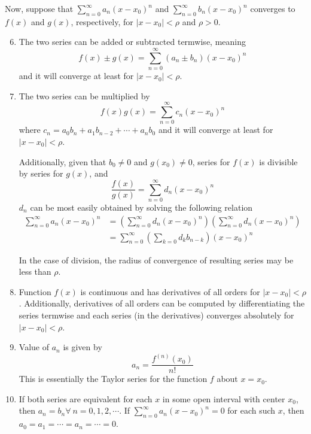 Now, suppose that $\sum_{n=0}^\infty a_n{(x-x_0)}^n$ and $\sum_{n=0}^\infty b_n{(x-x_0)}^n$ converges 
to $f(x)$ and $g(x)$, respectively, for $|x-x_0| < \rho$ and $\rho > 0$.

\begin{enumerate}
    \setcounter{enumi}{5}
    \item The two series can be added or subtracted termwise, meaning
        \[ f(x) \pm g(x) = \sum_{n=0}^\infty (a_n \pm b_n){(x-x_0)}^n \]
        and it will converge at least for $|x - x_0| < \rho$.
    \item The two series can be multiplied by
        \[ f(x)g(x) = \sum_{n = 0}^\infty c_n{(x - x_0)}^n \] 
        where $c_n = a_0 b_n + a_1 b_{n-2} + \cdots + a_n b_0$ and it will converge at least for
        $|x - x_0| < \rho$.

        Additionally, given that $b_0 \neq 0$ and $g(x_0) \neq 0$, series for $f(x)$ is divisible by series for $g(x)$,
        and \[ \frac{f(x)}{g(x)} = \sum_{n=0}^\infty d_n{(x - x_0)}^n \]
        $d_n$ can be most easily obtained by solving the following relation
        \begin{align*}
            \sum_{n=0}^\infty a_n{(x-x_0)}^n
                &= \left(\sum_{n=0}^\infty d_n{(x-x_0)}^n\right) \left(\sum_{n=0}^\infty d_n{(x-x_0)}^n\right)\\
                &= \sum_{n=0}^\infty\left(\sum_{k=0} d_k b_{n-k}\right){(x-x_0)}^n
        \end{align*}

        In the case of division, the radius of convergence of resulting series may be less than $\rho$.
    \item Function $f(x)$ is continuous and has derivatives of all orders for $|x-x_0| < \rho$.
        Additionally, derivatives of all orders can be computed by differentiating the series termwise
        and each series (in the derivatives) converges absolutely for $|x-x_0| < \rho$.
    \item Value of $a_n$ is given by \[ a_n = \frac{f^{(n)}(x_0)}{n!} \]
        This is essentially the Taylor series for the function $f$ about $x = x_0$.
    \item If both series are equivalent for each $x$ in some open interval with center $x_0$,
        then $a_n = b_n \forall\ n = 0, 1, 2, \cdots$. If $\sum_{n=0}^\infty a_n{(x - x_0)}^n = 0$ for 
        each such $x$, then $a_0 = a_1 = \cdots = a_n = \cdots = 0$.
\end{enumerate}

